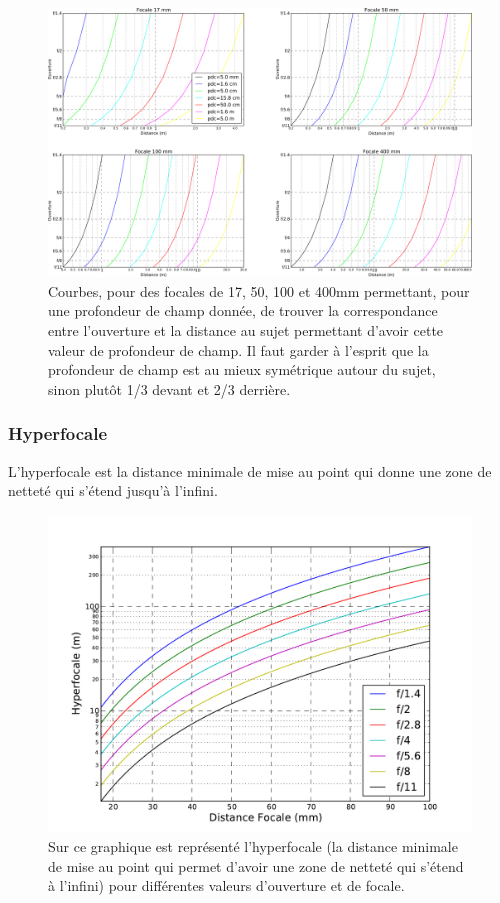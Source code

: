 \documentclass[a4paper,twoside]{article}
\begin{document}
\begin{figure}[htb]
\centering
\includegraphics[width=\linewidth]{figure/pdc.pdf}
\caption{Courbes, pour des focales de 17, 50, 100 et 400mm permettant, pour une profondeur de champ donnée, de trouver la correspondance entre l'ouverture et la distance au sujet permettant d'avoir cette valeur de profondeur de champ. Il faut garder à l'esprit que la profondeur de champ est au mieux symétrique autour du sujet, sinon plutôt 1/3 devant et 2/3 derrière.}\label{fig:pdc}
\end{figure}


\subsubsection{Hyperfocale}
L'hyperfocale est la distance minimale de mise au point qui donne une zone de netteté qui s'étend jusqu'à l'infini.

\begin{figure}[htb]
\centering
\includegraphics[width=0.5\linewidth]{figure/hyperfocal.pdf}
\caption{Sur ce graphique est représenté l'hyperfocale (la distance minimale de mise au point qui permet d'avoir une zone de netteté qui s'étend à l'infini) pour différentes valeurs d'ouverture et de focale.}
\end{figure}
\end{document}
